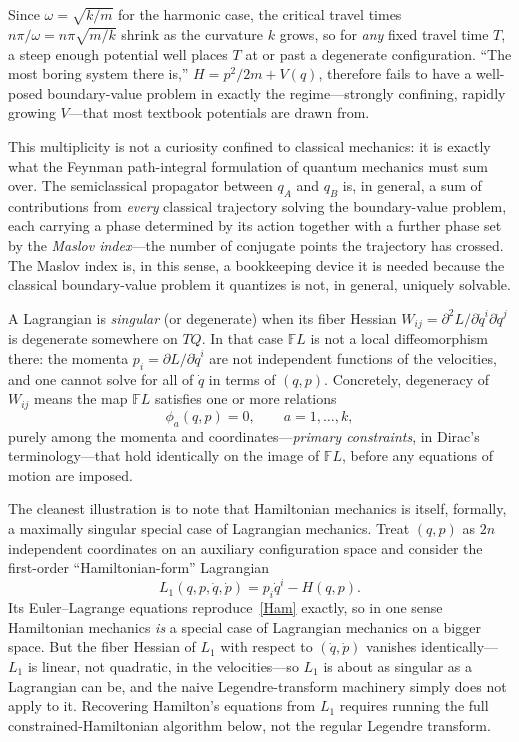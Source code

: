  Since $\omega=\sqrt{k/m}$ for the harmonic case,
the critical travel times $n\pi/\omega = n\pi\sqrt{m/k}$ shrink as the
curvature $k$ grows, so for \emph{any} fixed travel time $T$, a steep enough
potential well places $T$ at or past a degenerate configuration. ``The most
boring system there is,'' $H=p^2/2m+V(q)$, therefore fails to have a well-posed
boundary-value problem in exactly the regime---strongly confining, rapidly
growing $V$---that most textbook potentials are drawn from.

This multiplicity is not a curiosity confined to classical mechanics: it is
exactly what the Feynman path-integral formulation of quantum mechanics must
sum over. The semiclassical propagator between $q_A$ and $q_B$ is, in general,
a sum of contributions from \emph{every} classical trajectory solving the
boundary-value problem, each carrying a phase determined by its action together
with a further phase set by the \emph{Maslov index}---the number of conjugate
points the trajectory has crossed. The Maslov index is, in
this sense, a bookkeeping device  it is needed because the classical
boundary-value problem it
quantizes is not, in general, uniquely solvable.

A Lagrangian is \emph{singular} (or degenerate) when its fiber Hessian $W_{ij}
= \partial^2 L/\partial \dot q^i \partial \dot q^j$ is degenerate somewhere on
$TQ$. In that case $\mathbb{F}L$ is not a local diffeomorphism there: the
momenta $p_i = \partial L/\partial \dot q^i$ are not independent functions of
the velocities, and one cannot solve for all of $\dot q$ in terms of $(q,p)$.
Concretely, degeneracy of $W_{ij}$ means the map $\mathbb{F}L$ satisfies one or
more relations
\begin{equation}
\phi_a(q,p) = 0, \qquad a = 1,\dots,k,
\end{equation}
purely among the momenta and coordinates---\emph{primary constraints}, in
Dirac's terminology---that hold identically on the image of $\mathbb{F}L$,
before any equations of motion are imposed.

The cleanest illustration is to note that Hamiltonian mechanics is itself,
formally, a maximally singular special case of Lagrangian mechanics. Treat
$(q,p)$ as $2n$ independent coordinates on an auxiliary configuration space and
consider the first-order ``Hamiltonian-form'' Lagrangian
\begin{equation}
L_1(q,p,\dot q,\dot p) = p_i \dot q^i - H(q,p).
\end{equation}
Its Euler--Lagrange equations reproduce~\eqref{Ham} exactly, so in one sense
Hamiltonian mechanics \emph{is} a special case of Lagrangian mechanics on a
bigger space. But the fiber Hessian of $L_1$ with respect to $(\dot q,\dot p)$
vanishes identically---$L_1$ is linear, not quadratic, in the velocities---so
$L_1$ is about as singular as a Lagrangian can be, and the naive
Legendre-transform machinery simply does not
apply to it. Recovering Hamilton's equations from $L_1$ requires running the
full constrained-Hamiltonian algorithm below, not the regular Legendre
transform.

